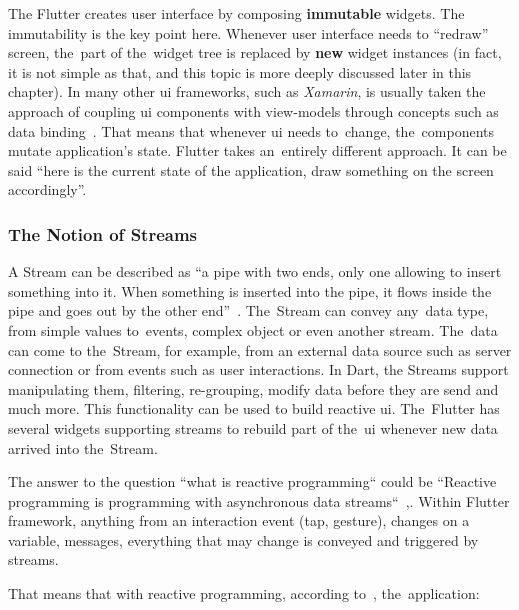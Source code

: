 The Flutter creates user interface by composing \textbf{immutable} widgets. The immutability is the key point here. Whenever user interface needs to ``redraw'' screen, the~part of the~widget tree is replaced by \textbf{new} widget instances (in fact, it is not simple as that, and this topic is more deeply discussed later in this chapter). In many other \gls{ui} frameworks, such as \textit{Xamarin}, is usually taken the approach of coupling \gls{ui} components with view-models through concepts such as data binding~\cite{xamarin-data-binding}. That means that whenever \gls{ui} needs to~change, the~components mutate application's state. Flutter takes an~entirely different approach. It can be said ``here is the current state of the application, draw something on the screen accordingly''.

\subsubsection{The Notion of Streams}
A Stream can be described as ``a pipe with two ends, only one allowing to insert something into it. When something is inserted into the pipe, it flows inside the pipe and goes out by the other end''~\cite{reactive-didier}. The~Stream can convey any~data type, from simple values to~events, complex object or even another stream. The~data can come to the~Stream, for example, from an external data source such as server connection or from events such as user interactions. In Dart, the Streams support manipulating them, filtering, re-grouping, modify data before they are send and much more. This functionality can be used to build reactive \gls{ui}. The~Flutter has several widgets supporting streams to rebuild part of the~\gls{ui} whenever new data arrived into the~Stream.

The answer to the question ``what is reactive programming`` could be ``Reactive programming is programming with asynchronous data streams``~\cite{reactive-didier},\cite{reactive-red-hat}. Within Flutter framework, anything from an interaction event (tap, gesture), changes on a variable, messages, everything that may change is conveyed and triggered by streams.

That means that with reactive programming, according to~\cite{reactive-didier}, the~application:

